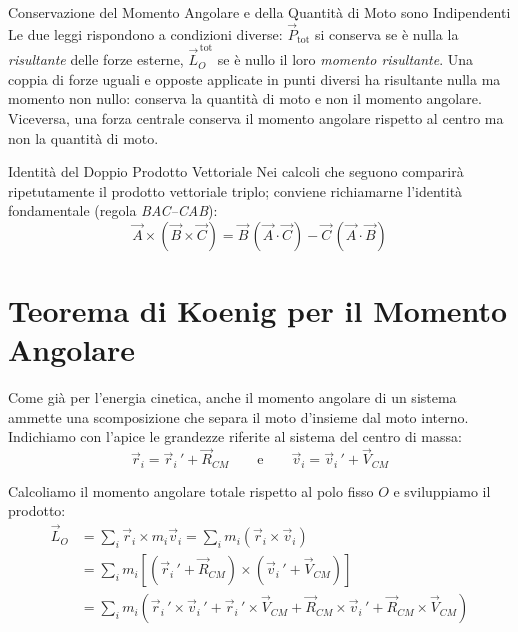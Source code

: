 \begin{attenzione}{Conservazione del Momento Angolare e della Quantità di Moto sono Indipendenti}
Le due leggi rispondono a condizioni diverse: $\vec{P}_{\text{tot}}$ si conserva se è nulla la \emph{risultante} delle forze esterne, $\vec{L}_O^{\,\text{tot}}$ se è nullo il loro \emph{momento risultante}. Una coppia di forze uguali e opposte applicate in punti diversi ha risultante nulla ma momento non nullo: conserva la quantità di moto e non il momento angolare. Viceversa, una forza centrale conserva il momento angolare rispetto al centro ma non la quantità di moto.
\end{attenzione}

\begin{osservazione}{Identità del Doppio Prodotto Vettoriale}
Nei calcoli che seguono comparirà ripetutamente il prodotto vettoriale triplo; conviene richiamarne l'identità fondamentale (regola \emph{BAC--CAB}):
\begin{equation*}
    \vec{A} \times (\vec{B} \times \vec{C})
    = \vec{B}\,(\vec{A} \cdot \vec{C}) - \vec{C}\,(\vec{A} \cdot \vec{B})
\end{equation*}
\end{osservazione}

\section{Teorema di Koenig per il Momento Angolare}

Come già per l'energia cinetica, anche il momento angolare di un sistema ammette una scomposizione che separa il moto d'insieme dal moto interno. Indichiamo con l'apice le grandezze riferite al sistema del centro di massa:
\begin{equation}
    \vec{r}_i = \vec{r}_i\,' + \vec{R}_{CM}
    \qquad \text{e} \qquad
    \vec{v}_i = \vec{v}_i\,' + \vec{V}_{CM}
\end{equation}

Calcoliamo il momento angolare totale rispetto al polo fisso $O$ e sviluppiamo il prodotto:
\begin{align}
    \vec{L}_O &= \sum_i \vec{r}_i \times m_i \vec{v}_i = \sum_i m_i (\vec{r}_i \times \vec{v}_i) \\
    &= \sum_i m_i \left[ (\vec{r}_i\,' + \vec{R}_{CM}) \times (\vec{v}_i\,' + \vec{V}_{CM}) \right] \\
    &= \sum_i m_i \left( \vec{r}_i\,' \times \vec{v}_i\,'
       + \vec{r}_i\,' \times \vec{V}_{CM}
       + \vec{R}_{CM} \times \vec{v}_i\,'
       + \vec{R}_{CM} \times \vec{V}_{CM} \right)
\end{align}

